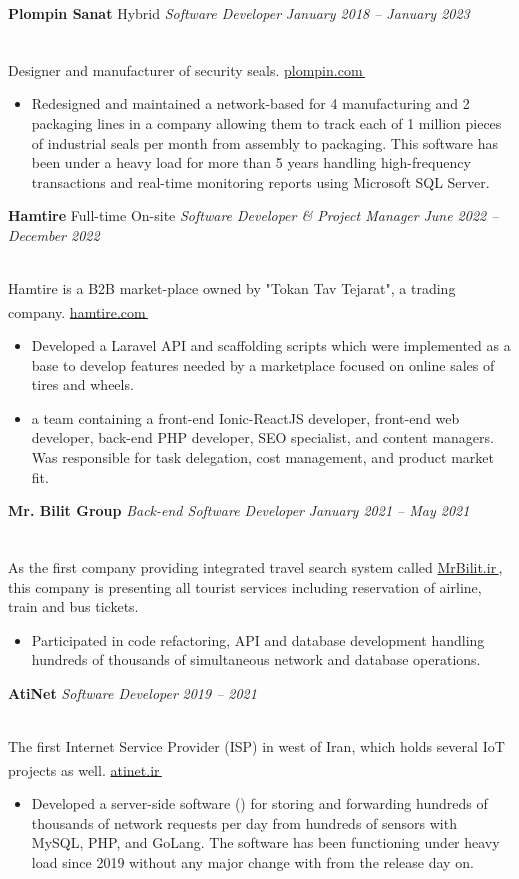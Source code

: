 \documentclass[11pt,a4paper]{article}
\makeatletter
\let\orighref\href
\renewcommand{\href}[2]{\orighref{#1}{#2\,{\textsuperscript{\tiny{\textcolor{heritagered}{\faExternalLink}}}}}}
\newcommand{\deemph}[1]{{\color{gray}#1}}
\newcommand{\info}[1]{
    \\
    \deemph{
        \faInfoCircle
        \hspace{0.15in}
         #1
     }
     \vspace{-7pt}
}
\newcommand{\resumeItem}[1]{
  \item\small{
    {#1 \vspace{-2pt}}
  }
}
\newcommand{\resumeSubheading}[4]{
  \vspace{-2pt}\item
      \textbf{#1} \small\deemph{#2}
      \textit{\small #3} \hfill \textit{\small\deemph{\textcolor{marineblue}{#4}}}
    \vspace{0pt}
}
\newcommand{\resumeItemListStart}{\begin{itemize}}
\newcommand{\resumeItemListEnd}{\end{itemize}\vspace{-5pt}}
\makeatother
\begin{document}
    \resumeSubheading
      {Plompin Sanat}{Hybrid}
      {Software Developer}{January 2018 -- January 2023}
      \info{Designer and manufacturer of security seals. \href{http://en.plompin.com}{plompin.com}}
      \resumeItemListStart
        \resumeItem{Redesigned and maintained a network-based \highlight{desktop application} for 4 manufacturing and 2 packaging lines in a company allowing them to track each of 1 million pieces of industrial seals per month from assembly to packaging. This software has been under a heavy load for more than 5 years handling high-frequency transactions and real-time monitoring reports using Microsoft SQL Server.}
        \resumeItemListEnd

    \resumeSubheading
      {Hamtire}{Full-time On-site}
      {Software Developer \& Project Manager}{June 2022 -- December 2022}
      \info{Hamtire is a B2B market-place owned by "Tokan Tav Tejarat", a trading company. \href{https://hamtire.com}{hamtire.com}}
      \resumeItemListStart
        \resumeItem{Developed a Laravel API and scaffolding scripts which were implemented as a base to develop features needed by a marketplace focused on online sales of tires and wheels. }
        \resumeItem{ a team containing a front-end Ionic-ReactJS developer, front-end web developer, back-end PHP developer, SEO specialist, and content managers. Was responsible for task delegation, cost management, and product market fit.}
        \resumeItemListEnd

    \resumeSubheading
      {Mr. Bilit Group}{}
      {Back-end Software Developer}{January 2021 -- May 2021}
      \info{As the first company providing integrated travel search system called \href{MrBilit.ir}{MrBilit.ir}, this company is presenting all tourist services including reservation of airline, train and bus tickets.}
      \resumeItemListStart
        \resumeItem{Participated in code refactoring, API and database development handling hundreds of thousands of simultaneous network and database operations.}
        \resumeItemListEnd
        
    \resumeSubheading
      {AtiNet}{}
      {Software Developer}{2019 -- 2021}
      \info{The first Internet Service Provider (ISP) in west of Iran, which holds several IoT projects as well. \href{https://atinet.ir}{atinet.ir}}
      \resumeItemListStart
        \resumeItem{Developed a server-side software () for storing and forwarding hundreds of thousands of network requests per day from hundreds of sensors with MySQL, PHP, and GoLang. The software has been functioning under heavy load since 2019 without any major change with \highlight{almost no incidents} from the release day on.}
        \resumeItemListEnd
      
\end{document}

